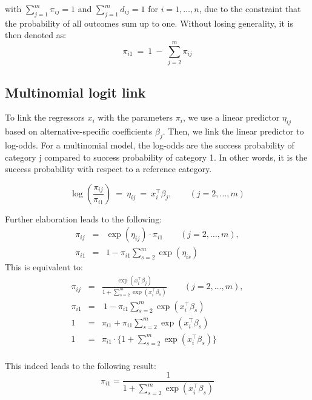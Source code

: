 \documentclass[12pt]{article}
\begin{document}
with $\sum_{j = 1}^m \pi_{ij} = 1$ and $\sum_{j = 1}^m d_{ij} = 1$ for $i = 1, \dots, n$, due to the constraint that the probability of all outcomes sum up to one. Without losing generality, it is then denoted as:
\begin{equation*}
  \pi_{i1} ~=~ 1 ~-~ \sum_{j = 2}^m \pi_{ij}
\end{equation*}

\subsection{Multinomial logit link}
To link the regressors  $x_i$ with the parameters $\pi_{i}$, we use a linear predictor $\eta_{ij}$ based on alternative-specific coefficients  $\beta_{j}$. Then, we link the linear predictor to log-odds. For a multinomial model, the log-odds are the success probability of category j compared to success probability of category 1. In other words, it is the success probability with respect to a reference category.

\begin{equation}
    \label{eqn:logodds}
  \log \left( \frac{\pi_{ij}}{\pi_{i1}} \right) ~=~ \eta_{ij} ~=~ x_i^\top \beta_j, \qquad (j = 2, \dots, m)
\end{equation}

Further elaboration leads to the following:
\begin{eqnarray*}
  \pi_{ij} & = & \exp(\eta_{ij}) \cdot \pi_{i1} \qquad (j = 2, \dots, m), \\
  \pi_{i1} & = & 1 - \pi_{i1} \sum_{s = 2}^m \exp(\eta_{is})
\end{eqnarray*}
This is equivalent to:
\begin{eqnarray*}
\pi_{ij} & = & \frac{\exp(x_i^\top \beta_j)}{1 + \sum_{s = 2}^m \exp(x_i^\top \beta_s)} \qquad (j = 2, \dots, m), \\
  \pi_{i1} & = & \ 1 - \pi_{i1} \sum_{s = 2}^m \exp(x_i^\top \beta_s)  \\
1 & = & \pi_{i1} +  \pi_{i1} \sum_{s = 2}^m \exp(x_i^\top \beta_s)  \\ 
1 & = & \pi_{i1} \cdot \{1 + \sum_{s = 2}^m
 \exp(x_i^\top \beta_s)\}\\ 
\end{eqnarray*}

This indeed leads to the following result:
\begin{equation}
      \pi_{i1} = \frac{1}{1 + \sum_{s = 2}^m \exp(x_i^\top \beta_s)}
\end{equation}
\end{document}
